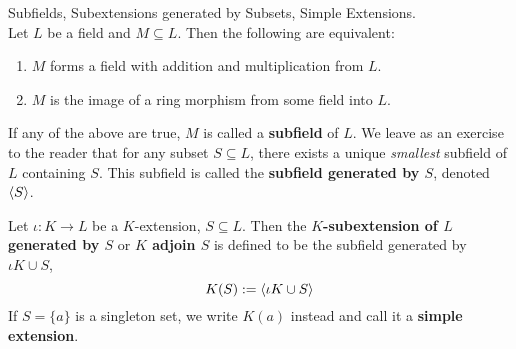 \documentclass[../book.tex]{subfiles}
\begin{document}
\begin{dfn} Subfields, Subextensions generated by Subsets, Simple Extensions. \\
Let $L$ be a field and $M \subseteq L$.
Then the following are equivalent: 
\begin{enumerate}
    \item $M$ forms a field with addition and multiplication from $L$.
    \item $M$ is the image of a ring morphism from some field into $L$. 
\end{enumerate}
If any of the above are true, $M$ is called a \textbf{subfield} of $L$. 
We leave as an exercise to the reader that for any subset $S \subseteq L$,
there exists a unique \emph{smallest} subfield of $L$ containing $S$.
This subfield is called the \textbf{subfield generated by $S$}, denoted $\langle S\rangle$. 

Let $\iota : K \to L$ be a $K$-extension, $S \subseteq L$. 
Then the \textbf{$K$-subextension of $L$ generated by $S$} or 
\textbf{$K$ adjoin $S$} is defined to be 
the subfield generated by $\iota K \cup S$, 
\[ K(S) := \langle \iota K \cup S\rangle \]
If $S = \{a\}$ is a singleton set, we write $K(a)$ instead
and call it a \textbf{simple extension}. 
\end{dfn}
\end{document}

